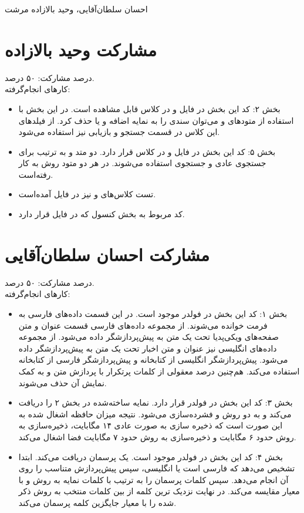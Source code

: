 \documentclass[11pt]{article}
\begin{document}
%
{احسان سلطان‌آقایی، وحید بالازاده مرشت}

\section*{مشارکت وحید بالازاده}
درصد مشارکت: ۵۰ درصد.\\

کارهای انجام‌گرفته:
\begin{itemize}
\item بخش ۲: کد این بخش در فایل  و در کلاس  قابل مشاهده است. در این بخش با استفاده از متودهای  و  می‌توان سندی را به نمایه اضافه و یا حذف کرد. از فیلدهای این کلاس در قسمت جستجو و بازیابی نیز استفاده می‌شود.
\item بخش ۵: کد این بخش در فایل  و در کلاس  قرار دارد. دو متد  و  به ترتیب برای جستجوی عادی و جستجوی  استفاده می‌شوند. در هر دو متود روش  به کار رفته‌است.
\item تست کلاس‌های  و  نیز در فایل  آمده‌است.
\item کد مربوط به بخش کنسول که در فایل  قرار دارد.
\end{itemize}
\section*{مشارکت احسان سلطان‌آقایی}
درصد مشارکت: ۵۰ درصد.\\

کارهای انجام‌گرفته:
\begin{itemize}
\item 
بخش ۱: کد این بخش در فولدر  موجود است. در این قسمت داده‌های فارسی به فرمت  خوانده می‌شوند. از مجموعه داده‌های فارسی قسمت عنوان و متن صفحه‌های ویکی‌پدیا تحت یک متن به پیش‌پردازشگر داده می‌شود. از مجموعه داده‌های انگلیسی نیز عنوان و متن اخبار تحت یک متن به پیش‌پردازشگر داده می‌شود. پیش‌پردازشگر انگلیسی از کتابخانه  و پیش‌پردازشگر فارسی از کتابخانه  استفاده می‌کند. هم‌چنین درصد معقولی از کلمات پرتکرار با پردازش متن و به کمک نمایش آن حذف می‌شوند.
\item 
بخش ۳: کد این بخش در فولدر  قرار دارد. نمایه ساخته‌شده در بخش ۲ را دریافت می‌کند و به دو روش  و  فشرده‌سازی می‌شود. نتیجه میزان حافظه اشغال شده به این صورت است که ذخیره سازی به صورت عادی ۱۴ مگابایت، ذخیره‌سازی به روش  حدود ۶ مگابایت و ذخیره‌سازی به روش  حدود ۷ مگابایت فضا اشغال می‌کند.
\item
بخش ۴: کد این بخش در فولدر  موجود است. یک پرسمان دریافت می‌کند. ابتدا تشخیص می‌دهد که فارسی است یا انگلیسی، سپس پیش‌پردازش متناسب را روی آن انجام می‌دهد. سپس کلمات پرسمان را به ترتیب با کلمات نمایه به روش  و با معیار  مقایسه می‌کند. در نهایت نزدیک ترین کلمه از بین کلمات منتخب به روش ذکر شده را با معیار  جایگزین کلمه پرسمان می‌کند.


\end{itemize}
\end{document}
